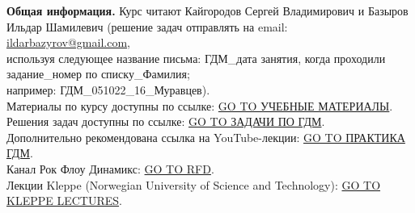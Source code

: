 \documentclass[main.tex]{subfiles}
\begin{document}
\textbf{Общая информация.} Курс читают Кайгородов Сергей Владимирович и Базыров Ильдар Шамилевич (решение задач отправлять на email: \href{mailto:ildarbazyrov@gmail.com}{ildarbazyrov@gmail.com},\\
используя следующее название письма: ГДМ\_дата занятия, когда проходили задание\_номер по списку\_Фамилия;\\
например: ГДМ\_051022\_16\_Муравцев).\\
Материалы по курсу доступны по ссылке: \href{https://csspbstu-my.sharepoint.com/:f:/g/personal/muravtsev_aa_edu_spbstu_ru/Epiacj6WFMBHqIF6E3YQgCMB7yi5NAA1ycqFLqrTZMhJ4w?e=i2agP0}{GO TO УЧЕБНЫЕ МАТЕРИАЛЫ}.\\
Решения задач доступны по ссылке: \href{https://mualal.github.io/source/tex/reservoir-hydrodynamic-modelling-2022/hdm_problems_solving/hdm_problems_solving_Muravtsev.pdf}{GO TO ЗАДАЧИ ПО ГДМ}.\\
Дополнительно рекомендована ссылка на YouTube-лекции: \href{https://youtube.com/playlist?list=PLDW64ZxU0_y5QCvZ048VptkQPoKJZPdEc}{GO TO ПРАКТИКА ГДМ}.\\
Канал Рок Флоу Динамикс: \href{https://www.youtube.com/c/RockFlowDynamics/playlists}{GO TO RFD}.\\
Лекции Kleppe (Norwegian University of Science and Technology): \href{http://www.ipt.ntnu.no/~kleppe/TPG4160/}{GO TO KLEPPE LECTURES}.
\end{document}
